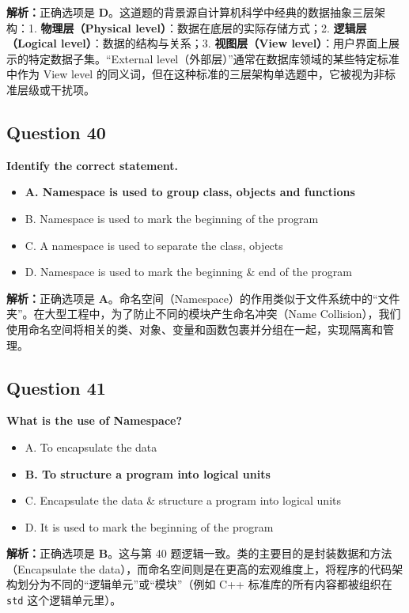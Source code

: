 \documentclass[11pt, a4paper]{article}
\begin{document}
\textbf{解析：}正确选项是 \textbf{D}。这道题的背景源自计算机科学中经典的数据抽象三层架构：1. \textbf{物理层（Physical level）}：数据在底层的实际存储方式；2. \textbf{逻辑层（Logical level）}：数据的结构与关系；3. \textbf{视图层（View level）}：用户界面上展示的特定数据子集。“External level（外部层）”通常在数据库领域的某些特定标准中作为 View level 的同义词，但在这种标准的三层架构单选题中，它被视为非标准层级或干扰项。


\subsection*{Question 40}
\textbf{Identify the correct statement.}
\begin{itemize}
    \item \textbf{A. Namespace is used to group class, objects and functions}
    \item B. Namespace is used to mark the beginning of the program
    \item C. A namespace is used to separate the class, objects
    \item D. Namespace is used to mark the beginning \& end of the program
\end{itemize}

\textbf{解析：}正确选项是 \textbf{A}。命名空间（Namespace）的作用类似于文件系统中的“文件夹”。在大型工程中，为了防止不同的模块产生命名冲突（Name Collision），我们使用命名空间将相关的类、对象、变量和函数包裹并分组在一起，实现隔离和管理。


\subsection*{Question 41}
\textbf{What is the use of Namespace?}
\begin{itemize}
    \item A. To encapsulate the data
    \item \textbf{B. To structure a program into logical units}
    \item C. Encapsulate the data \& structure a program into logical units
    \item D. It is used to mark the beginning of the program
\end{itemize}

\textbf{解析：}正确选项是 \textbf{B}。这与第 40 题逻辑一致。类的主要目的是封装数据和方法（Encapsulate the data），而命名空间则是在更高的宏观维度上，将程序的代码架构划分为不同的“逻辑单元”或“模块”（例如 C++ 标准库的所有内容都被组织在 \texttt{std} 这个逻辑单元里）。
\end{document}
